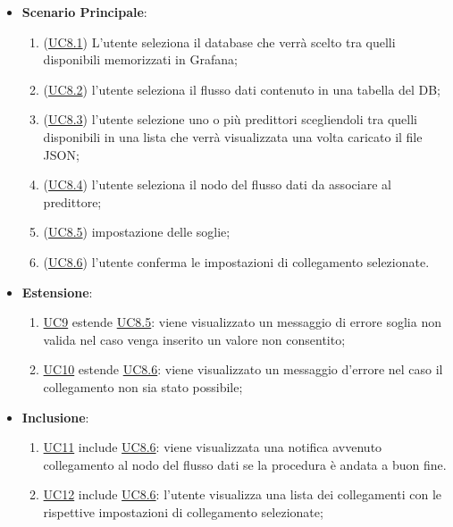 \begin{itemize}
			\item\textbf{Scenario Principale}:
				\begin{enumerate}
					\item (\hyperref[par:UC8.1]{UC8.1}) L’utente seleziona il database che verrà scelto tra quelli disponibili memorizzati in Grafana;
					\item (\hyperref[par:UC8.2]{UC8.2}) l’utente seleziona il flusso dati contenuto in una tabella del DB;
					\item (\hyperref[par:UC8.3]{UC8.3}) l'utente selezione uno o più predittori scegliendoli tra quelli disponibili in una lista che verrà visualizzata una volta caricato il file JSON; 
					\item (\hyperref[par:UC8.4]{UC8.4}) l'utente seleziona il nodo del flusso dati da associare al predittore;
					\item (\hyperref[par:UC8.5]{UC8.5}) impostazione delle soglie;
					\item (\hyperref[par:UC8.6]{UC8.6}) l'utente conferma le impostazioni di collegamento selezionate.	
				\end{enumerate}
			\item\textbf{Estensione}: 
				\begin{enumerate}
					\item\hyperref[par:UC9]{UC9} estende \hyperref[par:UC8.5]{UC8.5}: viene visualizzato un messaggio di errore soglia non valida nel caso venga inserito un valore non consentito;
					\item\hyperref[par:UC10]{UC10} estende \hyperref[par:UC8.6]{UC8.6}: viene visualizzato un messaggio d’errore nel caso il collegamento non sia stato possibile;
				\end{enumerate}
			\item\textbf{Inclusione}:
				\begin{enumerate}
					\item\hyperref[par:UC11]{UC11} include \hyperref[par:UC8.6]{UC8.6}: viene visualizzata una notifica avvenuto collegamento al nodo del flusso dati se la procedura è andata a buon fine.
					\item\hyperref[par:UC12]{UC12} include \hyperref[par:UC8.6]{UC8.6}:  l'utente visualizza una lista dei collegamenti con le rispettive impostazioni di collegamento selezionate;
				\end{enumerate}
		\end{itemize}
		
		\label{par:UC8.1}
